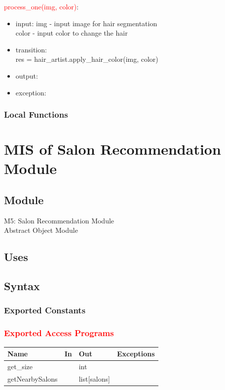 \documentclass[12pt, titlepage]{article}
\begin{document}
\noindent
\textcolor{red}{process\_one(img, color)}: 
\begin{itemize}
\item input: img - input image for hair segmentation \\ 
color - input color to change the hair \\
\item transition: \\
res = hair\_artist.apply\_hair\_color(img, color) \\
\item output:
\item exception:
\end{itemize}

\subsubsection{Local Functions}

\color{black}

 
\newpage
\section{MIS of Salon Recommendation Module} \label{Module} 

\subsection{Module}
M5: Salon Recommendation Module \\
Abstract Object Module


\subsection{Uses}


\subsection{Syntax}

\subsubsection{Exported Constants}

\subsubsection{\textcolor{red}{Exported Access Programs}}

\begin{center}
\begin{tabular}{p{4cm} p{3cm} p{4cm} p{4cm}}
\hline
\textbf{Name} & \textbf{In} & \textbf{Out} & \textbf{Exceptions} \\
\hline
get\_size & & int & \\
getNearbySalons & & list[salons] & \\
\hline
\end{tabular}
\end{center}
\end{document}
